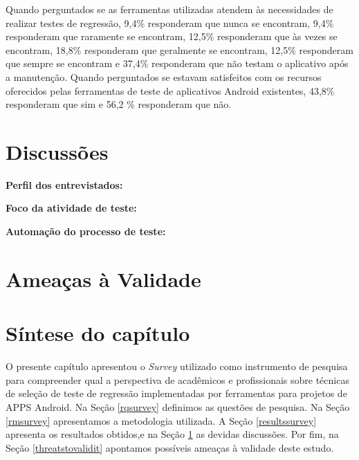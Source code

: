 \begin{enumerate}[label=\bf QP\arabic*]
Quando perguntados se as ferramentas utilizadas atendem às necessidades de realizar testes de regressão, 9,4\% responderam que nunca se encontram, 9,4\% responderam que raramente se encontram, 12,5\% responderam que às vezes se encontram, 18,8\% responderam que geralmente se encontram, 12,5\% responderam que sempre se encontram e 37,4\% responderam que não testam o aplicativo após a manutenção. Quando perguntados se estavam satisfeitos com os recursos oferecidos pelas ferramentas de teste de aplicativos Android existentes, 43,8\% responderam que sim e 56,2 \% responderam que não.

\end{enumerate}

\section{Discussões}\label{discussions}



\textbf{Perfil dos entrevistados:} 
    
\textbf{Foco da atividade de teste:} 
    
\textbf{Automação do processo de teste:} 

\section{Ameaças à Validade}\label{threatstovalidity}



\section{Síntese do capítulo}

O presente capítulo apresentou o \textit{Survey} utilizado como instrumento de pesquisa para compreender qual a perspectiva de acadêmicos e profissionais sobre técnicas de seleção de teste de regressão implementadas por ferramentas para projetos de \ac{APPS} Android. Na Seção \ref{rqsurvey} definimos as questões de pesquisa. Na Seção \ref{rmsurvey} apresentamos a metodologia utilizada. A Seção \ref{resultssurvey} apresenta os resultados obtidos,e na Seção \ref{discussions} as devidas discussões. Por fim, na Seção \ref{threatstovalidit} apontamos possíveis ameaças à validade deste estudo.




























